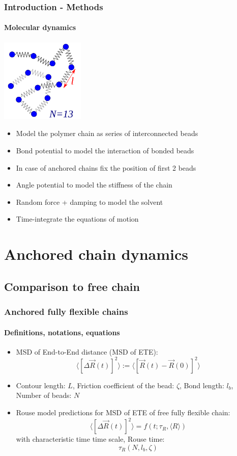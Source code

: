 \documentclass[handout]{beamer}
\newcommand{\E}[1]{\langle#1\rangle}
\begin{document}

\begin{frame}
    \frametitle{Introduction - Methods}
    \framesubtitle{Molecular dynamics}
    \centering
    \includegraphics[width=0.3\textwidth]{./bead_spring_model.png}
    \begin{itemize}
        \item Model the polymer chain as series of interconnected beads
        \item Bond potential to model the interaction of bonded beads
        \item In case of anchored chains fix the position of first 2 beads
        \item Angle potential to model the stiffness of the chain
        \item Random force + damping to model the solvent
        \item Time-integrate the equations of motion
    \end{itemize}
    
\end{frame}

\section{Anchored chain dynamics}




\subsection{Comparison to free chain}

\begin{frame}
    \frametitle{Anchored fully flexible chains}
    \framesubtitle{Definitions, notations, equations}
    \begin{itemize}
        \item MSD of End-to-End distance (MSD of ETE): 
        $$ \E{[\Delta \vec{R}(t)]^2} := \E{[\vec{R}(t)-\vec{R}(0)]^2} $$
        \item Contour length: $L$, Friction coefficient of the bead: $\zeta$,
        Bond length: $l_b$, Number of beads: $N$
        \item Rouse model predictions for MSD of ETE of free fully flexible chain:
        $$\E{[\Delta \vec{R}(t)]^2} = f(t; \tau_R, \E{R})$$
        with characteristic time time scale, Rouse time: $$\tau_R(N,l_b,\zeta)$$
    \end{itemize}
    
\end{frame}
\end{document}
